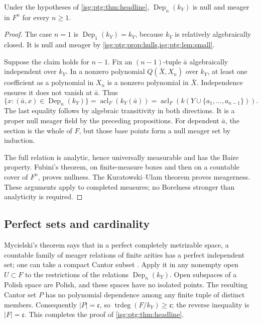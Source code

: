 \documentclass[11pt]{article}
\theoremstyle{definition}
\theoremstyle{remark}
\newcommand{\acl}{\operatorname{acl}}
\newcommand{\trdeg}{\operatorname{trdeg}}
\newcommand{\Dep}{\operatorname{Dep}}
\newcommand{\cfrak}{\mathfrak{c}}
\begin{document}
\begin{proposition}\label{isg:ptg:prop:relations}
Under the hypotheses of \cref{isg:ptg:thm:headline}, $\Dep_n(k_Y)$ is null
and meager in $F^n$ for every $n\geq1$.
\end{proposition}
\begin{proof}
The case $n=1$ is $\Dep_1(k_Y)=k_Y$, because $k_Y$ is relatively
algebraically closed. It is null and meager by
\cref{isg:ptg:prop:hulls,isg:ptg:lem:small}.

Suppose the claim holds for $n-1$. Fix an $(n-1)$-tuple $\bar a$
algebraically independent over $k_Y$. In a nonzero polynomial
$Q(\bar X,X_n)$ over $k_Y$, at least one coefficient as a polynomial in
$X_n$ is a nonzero polynomial in $\bar X$. Independence ensures it does not
vanish at $\bar a$. Thus
\[
 \{x:(\bar a,x)\in\Dep_n(k_Y)\}
      =\acl_F(k_Y(\bar a))
      =\acl_F(k(Y\cup\{a_1,\ldots,a_{n-1}\})).
\]
The last equality follows by algebraic transitivity in both directions. It
is a proper null meager field by the preceding propositions. For dependent
$\bar a$, the section is the whole of $F$, but those base points form a
null meager set by induction.

The full relation is analytic, hence universally measurable and has the
Baire property. Fubini's theorem, on finite-measure boxes and then on a
countable cover of $F^n$, proves nullness. The Kuratowski--Ulam theorem
proves meagerness. These arguments apply to completed measures; no
Borelness stronger than analyticity is required.
\end{proof}

\subsection{Perfect sets and cardinality}\label{isg:ptg:sec:perfectsets}
Mycielski's theorem says that in a perfect completely metrizable space, a
countable family of meager relations of finite arities has a perfect
independent set; one can take a compact Cantor subset
\cite{Mycielski,DolezalKubis}. Apply it in any nonempty open $U\subset F$
to the restrictions of the relations $\Dep_n(k_Y)$. Open subspaces of a
Polish space are Polish, and these spaces have no isolated points. The
resulting Cantor set $P$ has no polynomial dependence among any finite
tuple of distinct members. Consequently $|P|=\cfrak$, so
$\trdeg(F/k_Y)\geq\cfrak$; the reverse inequality is $|F|=\cfrak$. This
completes the proof of \cref{isg:ptg:thm:headline}.
\end{document}
